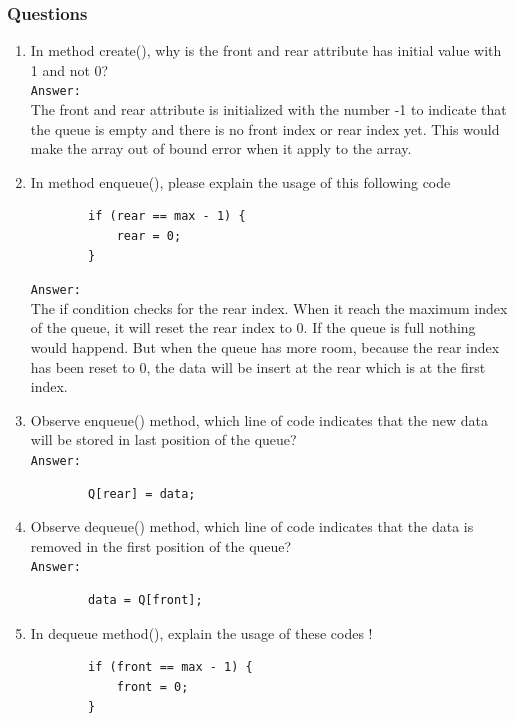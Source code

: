 \documentclass[12pt,titlepage]{article}
\begin{document}
\subsubsection{Questions}
\begin{enumerate}
    \item In method create(), why is the front and rear attribute has initial value with 1 and not 0?
    \mbox{}\\
    \texttt{Answer: }
    \mbox{}\\
    The front and rear attribute is initialized with the number -1 to indicate that the queue is empty and there is no front index or rear index yet. This would make the array out of bound error when it apply to the array.
    \item In method enqueue(), please explain the usage of this following code
    \begin{verbatim}
        if (rear == max - 1) {
            rear = 0;
        }
    \end{verbatim}
    \texttt{Answer: }
    \mbox{}\\
    The if condition checks for the rear index. When it reach the maximum index of the queue, it will reset the rear index to 0. If the queue is full nothing would happend. But when the queue has more room, because the rear index has been reset to 0, the data will be insert at the rear which is at the first index.
    \item Observe enqueue() method, which line of code indicates that the new data will be stored in last position of the queue?
    \mbox{}\\
    \texttt{Answer: }
    \begin{verbatim}
        Q[rear] = data;
    \end{verbatim}
    \item Observe dequeue() method, which line of code indicates that the data is removed in the first position of the queue?
    \mbox{}\\
    \texttt{Answer: }
    \begin{verbatim}
        data = Q[front];
    \end{verbatim}
    \item In dequeue method(), explain the usage of these codes !
    \begin{verbatim}
        if (front == max - 1) {
            front = 0;
        }
    \end{verbatim}

\end{enumerate}
\end{document}
